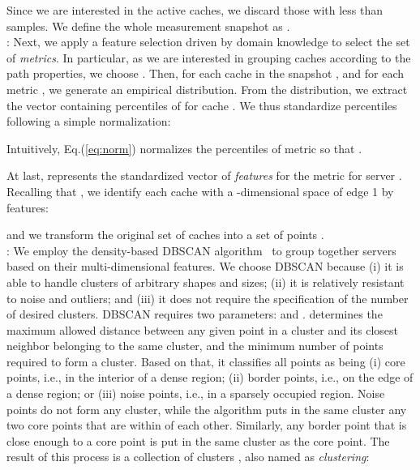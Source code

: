\documentclass{acm_proc_article-sp}
\begin{document}
Since we are interested in the active caches, we discard those with less than  samples.
We define the whole measurement snapshot  as .\\
:
Next, we apply a feature selection driven by domain knowledge to select the set  of {\it metrics}. In particular, as we are interested in grouping caches according to the path properties, we choose . Then, for each cache  in the snapshot , and for each metric , we generate an empirical distribution.
From the distribution, we extract the vector  containing  percentiles of  for cache .
We thus standardize percentiles following a simple normalization:

Intuitively, Eq.(\ref{eq:norm}) normalizes the percentiles of metric  so that .


At last,  represents the standardized vector of {\it features} for the metric  for server .
Recalling that , we identify each cache  with a -dimensional space of edge 1 by features:

and we transform the original set of caches  into a set of points .
\\
:
We employ the density-based DBSCAN algorithm~\cite{ester1996density} to group together servers based on their multi-dimensional features. We choose DBSCAN because (i) it is able to handle clusters of arbitrary shapes and sizes; (ii) it is relatively resistant to noise and outliers; and (iii) it does not require the specification of the number of desired clusters. DBSCAN requires two parameters:  and .  determines the maximum allowed distance between any given point in a cluster and its closest neighbor belonging to the same cluster, and  the minimum number of points required to form a cluster. Based on that, it classifies all points as being (i) core points, i.e., in the interior of a dense region; (ii) border points, i.e., on the edge of a dense region; or (iii) noise points, i.e., in a sparsely occupied region. Noise points do not form any cluster, while the algorithm puts in the same cluster any two core points that are within  of each other. Similarly, any border point that is close enough to a core point is put in the same cluster as the core point.
The result of this process is a collection  of clusters , also named as \textit{clustering}:
\end{document}
